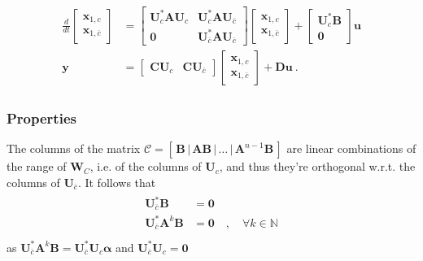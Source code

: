 \documentclass[letterpaper,10pt,english]{jupyterBook}
\begin{document}
\begin{equation*}
\begin{split}\begin{aligned}
 \frac{d}{dt} \begin{bmatrix} \mathbf{x}_{1,c} \\ \mathbf{x}_{1,\overline{c}} \end{bmatrix} & = \begin{bmatrix} \mathbf{U}_c^* \mathbf{A} \mathbf{U}_c & \mathbf{U}_c^* \mathbf{A} \mathbf{U}_{\overline{c}} \\ \mathbf{0} & \mathbf{U}_{\overline{c}}^* \mathbf{A} \mathbf{U}_{\overline{c}} \end{bmatrix} \begin{bmatrix} \mathbf{x}_{1,c} \\ \mathbf{x}_{1,\overline{c}} \end{bmatrix} + \begin{bmatrix} \mathbf{U}_c^* \mathbf{B} \\ \mathbf{0} \end{bmatrix} \mathbf{u} \\ 
  \mathbf{y} & = \begin{bmatrix} \mathbf{C} \mathbf{U}_c & \mathbf{C} \mathbf{U}_{\overline{c}} \end{bmatrix} \begin{bmatrix} \mathbf{x}_{1,c} \\ \mathbf{x}_{1, \overline{c}} \end{bmatrix} + \mathbf{D} \mathbf{u} \ .
\end{aligned}\end{split}
\end{equation*}\subsubsection*{Properties}

\sphinxAtStartPar
The columns of the matrix \(\mathscr{C} = [ \, \mathbf{B} \, | \, \mathbf{A} \mathbf{B} \, | \, \dots \, | \, \mathbf{A}^{n-1} \mathbf{B} \, ]\) are linear combinations of the range of \(\mathbf{W}_C\), i.e. of the columns of \(\mathbf{U}_c\), and thus they’re orthogonal w.r.t. the columns of \(\mathbf{U}_{\overline{c}}\). It follows that
\begin{equation*}
\begin{split}\begin{aligned}
  \mathbf{U}_{\overline{c}}^* \mathbf{B} & = \mathbf{0} \\
  \mathbf{U}_{\overline{c}}^* \mathbf{A}^k \mathbf{B} & = \mathbf{0} \quad , \quad \forall k \in \mathbb{N} \\
\end{aligned}\end{split}
\end{equation*}
\sphinxAtStartPar
as \(\mathbf{U}^*_{\overline{c}} \mathbf{A}^k \mathbf{B} = \mathbf{U}_{\overline{c}}^* \mathbf{U}_c \boldsymbol\alpha\) and \(\mathbf{U}_{\overline{c}}^* \mathbf{U}_c = \mathbf{0}\)
\end{document}
